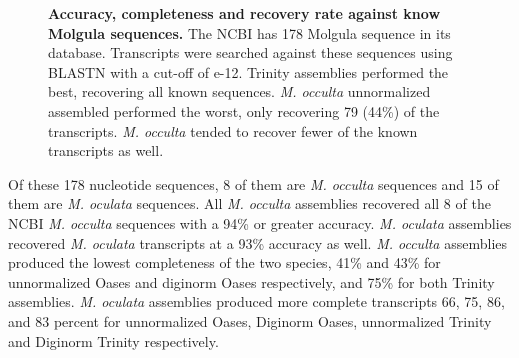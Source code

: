 \setcounter{subfigure}{0}
\begin{figure}[tbp]
	\begin{center}
	\end{center}
	\caption{\textbf{Accuracy, completeness and recovery rate against know Molgula sequences.} The NCBI has 178 Molgula sequence in its database. Transcripts were searched against these sequences using BLASTN with a cut-off of e-12. Trinity assemblies performed the best, recovering all known sequences. \textit{M. occulta} unnormalized assembled performed the worst, only recovering 79 (44\%) of the transcripts. \textit{M. occulta} tended to recover fewer of the known transcripts as well.}
	\label{fig:known_molg}
\end{figure}
     
Of these 178 nucleotide sequences, 8 of them are \textit{M. occulta} sequences and 15 of them are \textit{M. oculata} sequences. All \textit{M. occulta} assemblies recovered all 8 of the NCBI \textit{M. occulta} sequences with a 94\% or greater accuracy. \textit{M. oculata} assemblies recovered \textit{M. oculata} transcripts at a 93\% accuracy as well. \textit{M. occulta} assemblies produced the lowest completeness of the two species, 41\% and 43\% for unnormalized Oases and diginorm Oases respectively, and 75\% for both Trinity assemblies. \textit{M. oculata} assemblies produced more complete transcripts 66, 75, 86, and 83 percent for unnormalized Oases, Diginorm Oases, unnormalized Trinity and Diginorm Trinity respectively.


